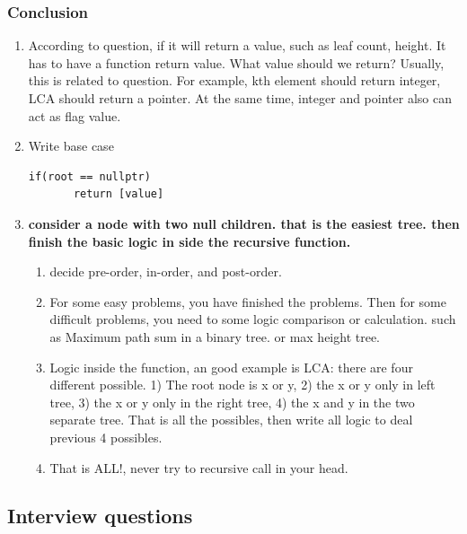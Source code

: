 \documentclass[a4paper,11pt,twoside]{book}
\begin{document}
\subsubsection{Conclusion}
\begin{enumerate}
\item According to question, if it will return a value, such as leaf count, height. It has to have a function return value. What value should we return? Usually, this is related to question. For example, kth element should return integer, LCA should return a pointer. At the same time, integer and pointer also can act as flag value. 

 
\item Write base case 
\begin{lstlisting}[breaklines]
if(root == nullptr) 
       return [value] 
\end{lstlisting}

\item \textbf{consider a node with two null children. that is the easiest tree. then finish the basic logic in side the recursive function.}
\begin{enumerate}
	\item decide pre-order, in-order, and post-order. 

	\item For some easy problems, you have finished the problems. Then for some difficult problems, you need to some logic comparison or calculation. such as Maximum path sum in a binary tree. or max height tree.
	
	\item Logic inside the function, an good example is LCA: there are four different possible. 1) The root node is x or y, 2) the x or y only in left tree, 3) the x or y only in the right tree, 4) the x and y in the two separate tree. That is all the possibles, then write all logic to deal previous 4 possibles. 
	
	\item That is ALL!, never try to recursive call in your head. 
\end{enumerate}

\end{enumerate}

\subsection{Interview questions}
\end{document}
